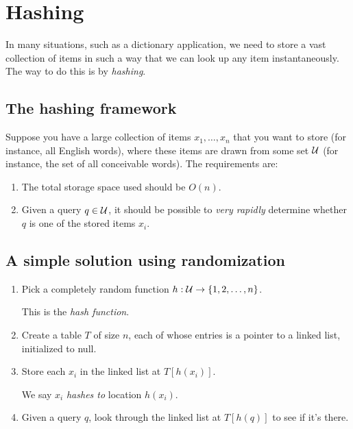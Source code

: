 \documentclass{report}
\theoremstyle{plain}
\theoremstyle{definition}
\def\U{{\cal U}}
\begin{document}
\lecturer{}
\scribe{}

\maketitle

\section{Hashing}

In many situations, such as a dictionary application, we need to store a vast 
collection of items in such a way that we can look up any item instantaneously. 
The way to do this is by {\it hashing}.

\subsection{The hashing framework}

Suppose you have a large collection of items $x_1, \ldots, x_n$ that you want 
to store (for instance, all English words), where these items are 
drawn from some set $\U$ (for instance, the set of all conceivable words). 
The requirements are:
\begin{enumerate}
\item The total storage space used should be $O(n)$.
\item Given a query $q \in \U$, it should be possible to {\it very rapidly}
determine whether $q$ is one of the stored items $x_i$.
\end{enumerate}

\subsection{A simple solution using randomization}

\begin{enumerate}
\item Pick a completely random function $h: \U \rightarrow \{1,2,\ldots, n\}$. 

This is the {\it hash function}. 

\item Create a table $T$ of size $n$, each of whose entries is a pointer to a 
linked list, initialized to null. 

\item Store each $x_i$ in the linked list at $T[h(x_i)]$.

We say $x_i$ {\it hashes to} location $h(x_i)$.

\item Given a query $q$, look through the linked list at $T[h(q)]$ to see if
it's there.
\end{enumerate}
\end{document}
